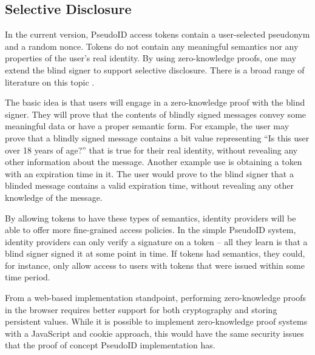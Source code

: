 \documentclass{llncs}
\begin{document}
\subsection{Selective Disclosure}

In the current version, PseudoID access tokens contain a user-selected
pseudonym and a random nonce. Tokens do not contain any meaningful
semantics nor any properties of the user's real identity. By using
zero-knowledge proofs, one may extend the blind signer to support
selective disclosure. There is a broad range of literature on this
topic \cite{Cha85,CaLy01,CaLy04,CHL05,CaGr08}.

The basic idea is that users will engage in a zero-knowledge proof
with the blind signer. They will prove that the contents of blindly
signed messages convey some meaningful data or have a proper semantic
form. For example, the user may prove that a blindly signed message
contains a bit value representing ``Is this user over 18 years of
age?'' that is true for their real identity, without revealing any
other information about the message. Another example use is obtaining
a token with an expiration time in it. The user would prove to the
blind signer that a blinded message contains a valid expiration time,
without revealing any other knowledge of the message.

By allowing tokens to have these types of semantics, identity
providers will be able to offer more fine-grained access policies. In
the simple PseudoID system, identity providers can only verify a signature on a
token -- all they learn is that a blind signer signed it at some point
in time. If tokens had semantics, they could, for instance, only allow
access to users with tokens that were issued within some time period.

From a web-based implementation standpoint, performing zero-knowledge
proofs in the browser requires better support for both cryptography
and storing persistent values. While it is possible to implement
zero-knowledge proof systems with a JavaScript and cookie approach,
this would have the same security issues that the proof of concept
PseudoID implementation has.



\end{document}
